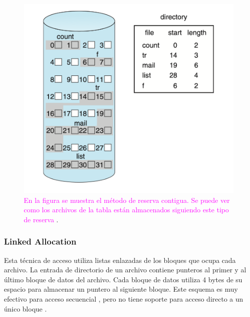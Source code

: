 \begin{figure}[H]
    \centering
    \includegraphics[scale=0.65]{doc/assets/images/Allocation Methods/continuous.png}
    \caption{ \textcolor{magenta}{En la figura se muestra el método de reserva contigua. Se puede ver como los archivos de la tabla están almacenados siguiendo este tipo de reserva }\cite{silberchatz}.}
    \label{fig:my_label}
\end{figure}



\subsubsection{Linked Allocation}
Esta técnica de acceso utiliza listas enlazadas de los bloques que ocupa cada archivo. La entrada de directorio de un archivo contiene punteros al primer y al último bloque de datos del archivo. Cada bloque de datos utiliza 4 bytes de su espacio para almacenar un puntero al siguiente bloque. Este esquema es muy efectivo para acceso secuencial , pero no tiene soporte para acceso directo a un único bloque \cite{silberchatz}.\\

